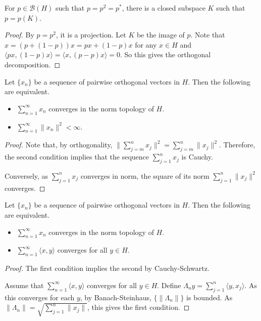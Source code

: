 \begin{lemma}
  \label{lem:exists_subspace}
  For $p \in \mathcal{B}(H)$ such that $p = p^2 = p^*$,
  there is a closed subspace $K$ such that $p = p(K)$.
\end{lemma}

\begin{proof}
  By $p = p^2$, it is a projection. Let $K$ be the image of $p$.
  Note that $x = (p + (1-p))x = px + (1-p)x$ for any $x \in H$
  and $\langle px, (1-p)x\rangle = \langle x, (p-p)x\rangle = 0$.
  So this gives the orthogonal decomposition.
\end{proof}

\begin{lemma}
  \label{lem:sum_orthogonal}
  Let $\{x_n\}$ be a sequence of pairwise orthogonal vectors in $H$.
  Then the following are equivalent.
  \begin{itemize}
    \item $\sum_{n=1}^\infty x_n$ converges in the norm topology of $H$.
    \item $\sum_{n=1}^\infty \|x_n\|^2 < \infty$.
  \end{itemize}
\end{lemma}

\begin{proof}
  Note that, by orthogonality,
  $\|\sum_{j=m}^n x_j\|^2 = \sum_{j=m}^n \|x_j\|^2$.
  Therefore, the second condition implies that the sequence $\sum_{j=1}^n x_j$ is Cauchy.

  Conversely, as $\sum_{j=1}^n x_j$ converges in norm, the square of its norm $\sum_{j=1}^n \|x_j\|^2$ converges.
\end{proof}

\begin{lemma}
  \label{lem:sum_orthogonal'}
  Let $\{x_n\}$ be a sequence of pairwise orthogonal vectors in $H$.
  Then the following are equivalent.
  \begin{itemize}
    \item $\sum_{n=1}^\infty x_n$ converges in the norm topology of $H$.
    \item $\sum_{n=1}^\infty \langle x, y\rangle$ converges for all $y \in H$.
  \end{itemize}
\end{lemma}
\begin{proof}
  The first condition implies the second by Cauchy-Schwartz.

  Assume that
  $\sum_{n=1}^\infty \langle x, y\rangle$ converges for all $y \in H$.
  Define $\Lambda_n y = \sum_{j=1}^n \langle y, x_j\rangle$.
  As this converges for each $y$, by Banach-Steinhaus, $\{\|\Lambda_n\|\}$ is bounded.
  As $\|\Lambda_n\| = \sqrt{\sum_{j=1}^n \|x_j\|}$, this gives the first condition.
\end{proof}


